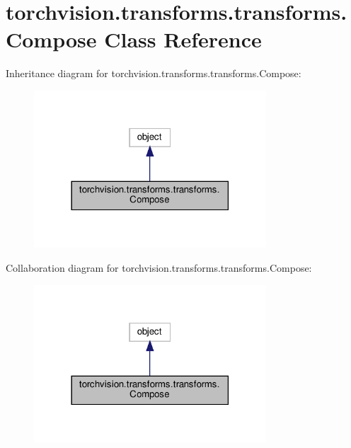 \hypertarget{classtorchvision_1_1transforms_1_1transforms_1_1Compose}{}\section{torchvision.\+transforms.\+transforms.\+Compose Class Reference}
\label{classtorchvision_1_1transforms_1_1transforms_1_1Compose}


Inheritance diagram for torchvision.\+transforms.\+transforms.\+Compose\+:
\nopagebreak
\begin{figure}[H]
\begin{center}
\leavevmode
\includegraphics[width=246pt]{classtorchvision_1_1transforms_1_1transforms_1_1Compose__inherit__graph}
\end{center}
\end{figure}


Collaboration diagram for torchvision.\+transforms.\+transforms.\+Compose\+:
\nopagebreak
\begin{figure}[H]
\begin{center}
\leavevmode
\includegraphics[width=246pt]{classtorchvision_1_1transforms_1_1transforms_1_1Compose__coll__graph}
\end{center}
\end{figure}
